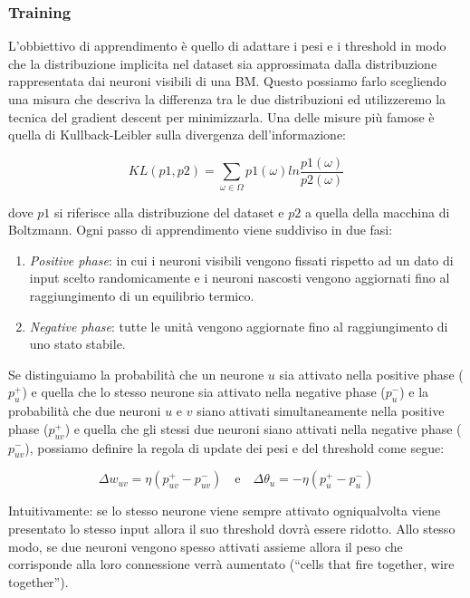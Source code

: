 \documentclass[10pt,a4paper]{article}
\begin{document}
\subsubsection{Training}

L'obbiettivo di apprendimento è quello di adattare i pesi e i threshold in modo che la distribuzione implicita nel dataset sia approssimata dalla distribuzione rappresentata dai neuroni visibili di una BM. Questo possiamo farlo scegliendo una misura che descriva la differenza tra le due distribuzioni ed utilizzeremo la tecnica del gradient descent per minimizzarla. Una delle misure più famose è quella di Kullback-Leibler sulla divergenza dell'informazione:

$$
KL(p1,p2) = \sum_{\omega \in \Omega} p1(\omega) ln\frac{p1(\omega)}{p2(\omega)}
$$ 

dove $p1$ si riferisce alla distribuzione del dataset e $p2$ a quella della macchina di Boltzmann. Ogni passo di apprendimento viene suddiviso in due fasi:

\begin{enumerate}
\item{\emph{Positive phase}: in cui i neuroni visibili vengono fissati rispetto ad un dato di input scelto randomicamente e i neuroni nascosti vengono aggiornati fino al raggiungimento di un equilibrio termico.}
\item{\emph{Negative phase}: tutte le unità vengono aggiornate fino al raggiungimento di uno stato stabile.}
\end{enumerate}

Se distinguiamo la probabilità che un neurone $u$ sia attivato nella positive phase ($p_u^{+}$) e quella che lo stesso neurone sia attivato nella negative phase ($p_u^{-}$) e la probabilità che due neuroni $u$ e $v$ siano attivati simultaneamente nella positive phase ($p_{uv}^{+}$) e quella che gli stessi due neuroni siano attivati nella negative phase ($p_{uv}^{-}$), possiamo definire la regola di update dei pesi e del threshold come segue:

$$
\Delta w_{uv} = \eta (p_{uv}^{+} - p_{uv}^{-}) 
\quad
\text{e}
\quad
\Delta \theta_u = -\eta(p_u^{+} - p_u^{-})
$$
 
Intuitivamente: se lo stesso neurone viene sempre attivato ogniqualvolta viene presentato lo stesso input allora il suo threshold dovrà essere ridotto. Allo stesso modo, se due neuroni vengono spesso attivati assieme allora il peso che corrisponde alla loro connessione verrà aumentato (“cells that fire together, wire together”).
\end{document}
